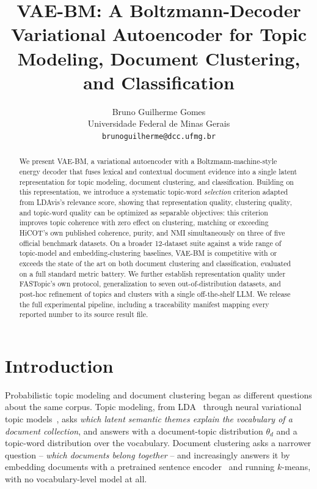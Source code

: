 \documentclass[11pt]{article}
\title{VAE-BM: A Boltzmann-Decoder Variational Autoencoder for Topic Modeling, Document Clustering, and Classification}
\author{Bruno Guilherme Gomes \\
  Universidade Federal de Minas Gerais \\
  \texttt{brunoguilherme@dcc.ufmg.br} \\}
\begin{document}
\maketitle

\begin{abstract}
We present VAE-BM, a variational autoencoder with a Boltzmann-machine-style energy decoder that fuses lexical and contextual document evidence into a single latent representation for topic modeling, document clustering, and classification. Building on this representation, we introduce a systematic topic-word \emph{selection} criterion adapted from LDAvis's relevance score, showing that representation quality, clustering quality, and topic-word quality can be optimized as separable objectives: this criterion improves topic coherence with zero effect on clustering, matching or exceeding HiCOT's own published coherence, purity, and NMI simultaneously on three of five official benchmark datasets. On a broader 12-dataset suite against a wide range of topic-model and embedding-clustering baselines, VAE-BM is competitive with or exceeds the state of the art on both document clustering and classification, evaluated on a full standard metric battery. We further establish representation quality under FASTopic's own protocol, generalization to seven out-of-distribution datasets, and post-hoc refinement of topics and clusters with a single off-the-shelf LLM. We release the full experimental pipeline, including a traceability manifest mapping every reported number to its source result file.
\end{abstract}

\section{Introduction}
\label{sec:intro}

Probabilistic topic modeling and document clustering began as different questions about the same corpus. Topic modeling, from LDA~\citep{blei2003lda} through neural variational topic models~\citep{miao2016nvdm,srivastava2017prodlda}, asks \emph{which latent semantic themes explain the vocabulary of a document collection}, and answers with a document-topic distribution $\theta_d$ and a topic-word distribution over the vocabulary. Document clustering asks a narrower question -- \emph{which documents belong together} -- and increasingly answers it by embedding documents with a pretrained sentence encoder~\citep{reimers2019sbert} and running $k$-means, with no vocabulary-level model at all.
\end{document}
